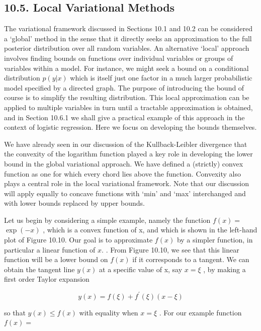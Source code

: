 \documentclass[
  10
]{article}
\begin{document}
\subsection{10.5. Local Variational
Methods}\label{local-variational-methods}

The variational framework discussed in Sections 10.1 and 10.2 can be
considered a `global' method in the sense that it directly seeks an
approximation to the full posterior distribution over all random
variables. An alternative `local' approach involves finding bounds on
functions over individual variables or groups of variables within a
model. For instance, we might seek a bound on a conditional distribution
\(p ( y | x )\) which is itself just one factor in a much larger
probabilistic model specified by a directed graph. The purpose of
introducing the bound of course is to simplify the resulting
distribution. This local approximation can be applied to multiple
variables in turn until a tractable approximation is obtained, and in
Section 10.6.1 we shall give a practical example of this approach in the
context of logistic regression. Here we focus on developing the bounds
themselves.

We have already seen in our discussion of the Kullback-Leibler
divergence that the convexity of the logarithm function played a key
role in developing the lower bound in the global variational approach.
We have defined a (strictly) convex function as one for which every
chord lies above the function. Convexity also plays a central role in
the local variational framework. Note that our discussion will apply
equally to concave functions with `min' and `max' interchanged and with
lower bounds replaced by upper bounds.

Let us begin by considering a simple example, namely the function
\(f ( x ) =\) \(\exp ( - x )\) , which is a convex function of x, and
which is shown in the left-hand plot of Figure 10.10. Our goal is to
approximate \(f ( x )\) by a simpler function, in particular a linear
function of \(x .\) . From Figure 10.10, we see that this linear
function will be a lower bound on \(f ( x )\) if it corresponds to a
tangent. We can obtain the tangent line \(y ( x )\) at a specific value
of x, say \(x = \xi\) , by making a first order Taylor expansion

\[
y (x) = f (\xi) + f ^ {\prime} (\xi) (x - \xi)\tag{10.125}
\]

so that \(y ( x ) \leqslant f ( x )\) with equality when \(x = \xi\) .
For our example function \(f ( x ) =\)
\end{document}
